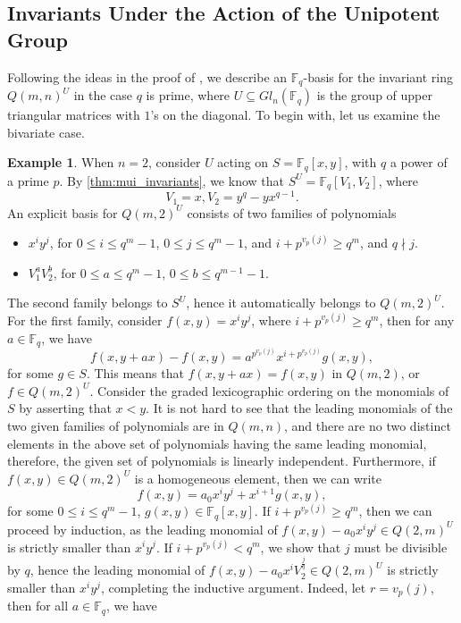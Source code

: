 \documentclass[12pt,a4paper]{report}
\theoremstyle{definition}
\theoremstyle{remark}
\theoremstyle{definition}
\newtheorem{example}[theorem]{Example}
\begin{document}
\subsection{Invariants Under the Action of the Unipotent Group}
Following the ideas in the proof of \cite[Theorem 1.6]{Ha_Hai_Nghia_2024}, we describe an $\mathbb{F}_q$-basis for the invariant ring $Q(m, n)^U$ in the case $q$ is prime, where $U\subseteq Gl_n(\mathbb{F}_q)$ is the group of upper triangular matrices with $1$'s on the diagonal. To begin with, let us examine the bivariate case.
\begin{example}
    When $n=2$, consider $U$ acting on $S = \mathbb{F}_q[x, y]$, with $q$ a power of a prime $p$. By \cref{thm:mui_invariants}, we know that $S^U = \mathbb{F}_q[V_1, V_2]$, where
    \begin{equation*}
        V_1 = x, V_2 = y^q - yx^{q-1}.
    \end{equation*}
    An explicit basis for $Q(m, 2)^U$ consists of two families of polynomials
    \begin{itemize}
    \item[(1)] $x^i y^j$, for $0\leq i\leq q^m-1$, $0\leq j\leq q^m-1$, and $i + p^{v_p(j)}\geq q^m$, and $q\nmid j$.
        \item[(2)]$V_1^a V_2^b$, for $0\leq a\leq q^m-1$, $0\leq b\leq q^{m-1}-1$.
    \end{itemize}
    The second family belongs to $S^U$, hence it automatically belongs to $Q(m, 2)^U$. For the first family, consider $f(x, y) = x^i y^j$, where $i + p^{v_p(j)}\geq q^m$, then for any $a\in \mathbb{F}_q$, we have
    \begin{equation*}
        f(x, y+ax) - f(x, y) = a^{p^{v_p(j)}}x^{i + p^{v_p(j)}} g(x, y),
    \end{equation*}
    for some $g\in S$. This means that $f(x, y+ax) = f(x, y)$ in $Q(m, 2)$, or $f\in Q(m, 2)^U$.\smallbreak
    Consider the graded lexicographic ordering on the monomials of $S$ by asserting that $x<y$. It is not hard to see that the leading monomials of the two given families of polynomials are in $Q(m, n)$, and there are no two distinct elements in the above set of polynomials having the same leading monomial, therefore, the given set of polynomials is linearly independent. Furthermore, if $f(x, y)\in Q(m, 2)^{U}$ is a homogeneous element, then we can write 
    \begin{equation*}
        f(x, y) =a_0 x^i y^j + x^{i+1} g(x, y),
    \end{equation*} 
    for some $0\leq i\leq q^m-1$, $g(x, y)\in \mathbb{F}_q[x, y]$. If $i + p^{v_p(j)}\geq q^m$, then we can proceed by induction, as the leading monomial of $f(x, y) - a_0 x^i y^j\in Q(2, m)^{U}$ is strictly smaller than $x^i y^j$. If $i + p^{v_p(j)}< q^m$, we show that $j$ must be divisible by $q$, hence the leading monomial of $f(x, y) - a_0 x^i V_2^{\frac{j}{q}}\in Q(2, m)^{U}$ is strictly smaller than $x^i y^j$, completing the inductive argument. Indeed, let $r = v_p(j)$, then for all $a\in \mathbb{F}_q$, we have

\end{example}
\end{document}

